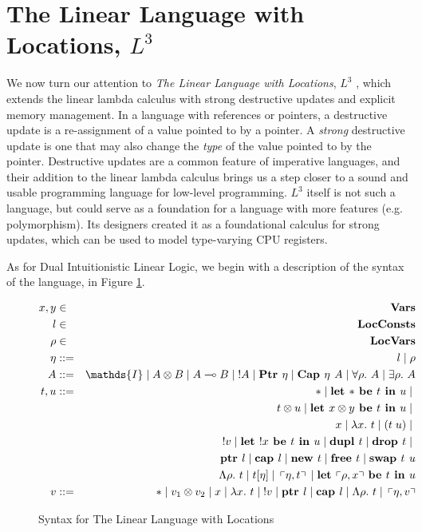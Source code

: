 \documentclass[]{unswthesis}
\newcommand{\Forall}[1]{\forall #1 \ldotp \,}
\newcommand{\Exists}[1]{\exists #1 \ldotp \,}
\newcommand{\lam}[1]{\lambda #1 \ldotp \,}
\newcommand{\Lam}[1]{\Lambda #1 \ldotp \,}
\newcommand{\app}[2]{(#1 \; #2)}
\newcommand{\lolly}{\multimap}
\newcommand{\letbe}[3]{\textbf{let $#1$ be $#2$ in $#3$}}
\newcommand{\sor}{\; | \;}
\newcommand{\Ptr}[1]{\textbf{Ptr $#1$}}
\newcommand{\ptr}[1]{\textbf{ptr $#1$}}
\newcommand{\Capa}[2]{\textbf{Cap $#1$ $#2$}}
\newcommand{\capa}[1]{\textbf{cap $#1$}}
\newcommand{\lquine}{\left\ulcorner}
\newcommand{\rquine}{\right\urcorner}
\newcommand{\dupl}[1]{\textbf{dupl $#1$}}
\newcommand{\drop}[1]{\textbf{drop $#1$}}
\newcommand{\lnew}[1]{\textbf{new $#1$}}
\newcommand{\lfree}[1]{\textbf{free $#1$}}
\newcommand{\lswap}[2]{\textbf{swap $#1$ $#2$}}
\newcommand{\qpair}[2]{\lquine #1, #2 \rquine}
\let\i\textit
\let\b\textbf
\begin{document}
\section{The Linear Language with Locations, $L^3$}

We now turn our attention to \i{The Linear Language with Locations}, $L^3$ \cite{ahmed05}, which extends the linear lambda calculus with strong destructive updates and explicit memory management. In a language with references or pointers, a destructive update is a re-assignment of a value pointed to by a pointer. A \i{strong} destructive update is one that may also change the \i{type} of the value pointed to by the pointer. Destructive updates are a common feature of imperative languages, and their addition to the linear lambda calculus brings us a step closer to a sound and usable programming language for low-level programming. $L^3$ itself is not such a language, but could serve as a foundation for a language with more features (e.g. polymorphism). Its designers created it as a foundational calculus for strong updates, which can be used to model type-varying CPU registers.


As for Dual Intuitionistic Linear Logic, we begin with a description of the syntax of the language, in Figure \ref{l3_syntax}.

\begin{figure}[h]
\caption{Syntax for The Linear Language with Locations}
\label{l3_syntax}
\begin{eqnarray*}
x,y & \in & \b{Vars} \\
l & \in & \b{LocConsts} \\
\rho & \in & \b{LocVars} \\
\eta & ::= & l \sor \rho \\
A & ::= & \mathds{I} \sor A \otimes B \sor A \lolly B \sor !A \sor \Ptr{\eta} \sor \Capa{\eta}{A} \sor
\Forall{\rho} A \sor \Exists{\rho} A \\
t,u & ::= & * \sor \letbe{*}{t}{u} \sor \\
  && t \otimes u \sor \letbe{x \otimes y}{t}{u} \sor \\
  && x \sor \lam{x} t \sor \app{t}{u} \sor \\
  && {!v} \sor \letbe{!x}{t}{u} \sor \dupl{t} \sor \drop{t} \sor \\
  && \ptr{l} \sor \capa{l} \sor \lnew{t} \sor \lfree{t} \sor \lswap{t}{u} \\
  && \Lam{\rho} t \sor t [\eta] \sor \qpair{\eta}{t} \sor \letbe{\qpair{\rho}{x}}{t}{u} \\
v & ::= & * \sor v_1 \otimes v_2 \sor x \sor \lam{x} t \sor {!v} \sor \ptr{l} \sor \capa{l}
  \sor \Lam{\rho} t \sor \qpair{\eta}{v}
\end{eqnarray*}
\end{figure}
\end{document}

